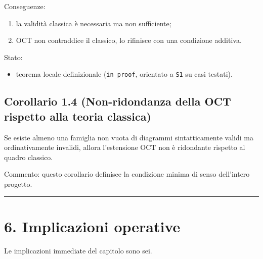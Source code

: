 Conseguenze:

\begin{enumerate}
\def\labelenumi{\arabic{enumi}.}
\tightlist
\item
  la validità classica è necessaria ma non sufficiente;
\item
  OCT non contraddice il classico, lo rifinisce con una condizione additiva.
\end{enumerate}

Stato:

\begin{itemize}
\tightlist
\item
  teorema locale definizionale (\texttt{in\_proof}, orientato a \texttt{S1} su casi testati).
\end{itemize}

\subsection{Corollario 1.4 (Non-ridondanza della OCT rispetto alla teoria classica)}

Se esiste almeno una famiglia non vuota di diagrammi sintatticamente validi ma ordinativamente invalidi, allora l'estensione OCT non è ridondante rispetto al quadro classico.

Commento:
questo corollario definisce la condizione minima di senso dell'intero progetto.

\begin{center}\rule{0.5\linewidth}{0.5pt}\end{center}

\section{6. Implicazioni operative}

Le implicazioni immediate del capitolo sono sei.

